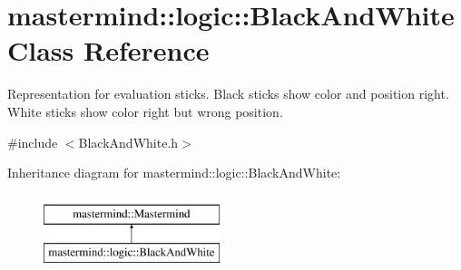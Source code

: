 \hypertarget{classmastermind_1_1logic_1_1_black_and_white}{}\section{mastermind\+:\+:logic\+:\+:Black\+And\+White Class Reference}
\label{classmastermind_1_1logic_1_1_black_and_white}


Representation for evaluation sticks. Black sticks show color and position right. White sticks show color right but wrong position.  




{\ttfamily \#include $<$Black\+And\+White.\+h$>$}

Inheritance diagram for mastermind\+:\+:logic\+:\+:Black\+And\+White\+:\begin{figure}[H]
\begin{center}
\leavevmode
\includegraphics[height=2.000000cm]{classmastermind_1_1logic_1_1_black_and_white}
\end{center}
\end{figure}
